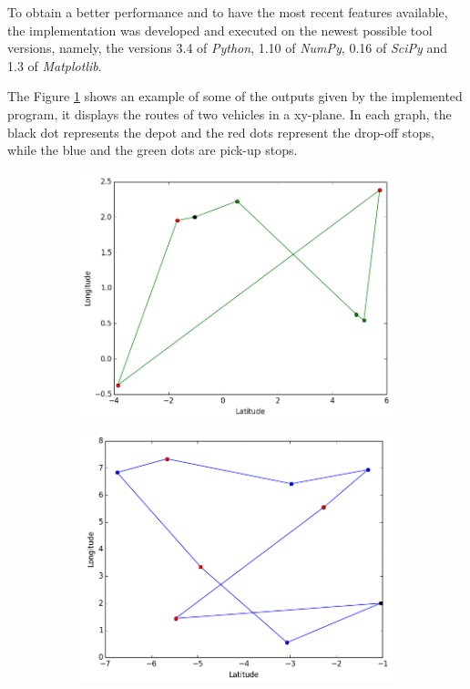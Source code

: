 \documentclass[tuberlin,cic,tc,openright,english,noabntcite,oneside]{iiufrgs}
\begin{document}
To obtain a better performance and to have the most recent features available, the implementation was developed and executed on the newest possible tool versions, namely, the versions 3.4 of \emph{Python}, 1.10 of \emph{NumPy}, 0.16 of \emph{SciPy} and 1.3 of \emph{Matplotlib}.

The Figure \ref{fig:output} shows an example of some of the outputs given by the implemented program, it displays the routes of two vehicles in a xy-plane. In each graph, the black dot represents the depot and the red dots represent the drop-off stops, while the blue and the green dots are pick-up stops.
\begin{figure}[H]
	\centering
    \caption{Example of output by the program}
    \begin{subfigure}[b]{0.49\textwidth}
	    \includegraphics[width=\textwidth]{fig_output1}
    \end{subfigure}
    \begin{subfigure}[b]{0.49\textwidth}
	    \includegraphics[width=\textwidth]{fig_output2}
    \end{subfigure}\par
    \label{fig:output}
\end{figure}
\end{document}
